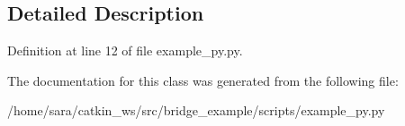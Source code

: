 \subsection{Detailed Description}


Definition at line 12 of file example\+\_\+py.\+py.



The documentation for this class was generated from the following file\+:\begin{DoxyCompactItemize}
\item 
/home/sara/catkin\+\_\+ws/src/bridge\+\_\+example/scripts/example\+\_\+py.\+py\end{DoxyCompactItemize}
